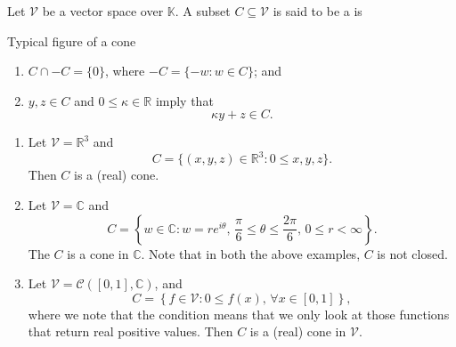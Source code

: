 \documentclass[notoc,notitlepage]{tufte-book}
\begin{document}
\begin{defn}\label{defn:real_cone}
  Let $\mathcal{V}$ be a vector space over $\mathbb{K}$. A subset $C \subseteq
  \mathcal{V}$ is said to be a  is
  \begin{marginfigure}
    \centering
    \caption{Typical figure of a cone}\label{fig:typical_figure_of_a_cone}
  \end{marginfigure}
  \begin{enumerate}
    \item $C \cap -C = \{ 0 \}$, where $-C = \{ - w : w \in C \}$; and
    \item $y, z \in C$ and $0 \leq \kappa \in \mathbb{R}$ imply that
      \begin{equation*}
        \kappa y + z \in C.
      \end{equation*}
  \end{enumerate}
\end{defn}

\begin{eg}
  \begin{enumerate}
    \item Let $\mathcal{V} = \mathbb{R}^3$ and
      \begin{equation*}
        C = \{ (x, y, z) \in \mathbb{R}^3 : 0 \leq x, y, z \}.
      \end{equation*}
      Then $C$ is a (real) cone.
    \item Let $\mathcal{V} = \mathbb{C}$ and 
      \begin{equation*}
        C = \left\{ w \in \mathbb{C} : w = re^{i\theta},\, \frac{\pi}{6} \leq
        \theta \leq \frac{2\pi}{6},\, 0 \leq r < \infty \right\}.
      \end{equation*}
      The $C$ is a cone in $\mathbb{C}$. Note that in both the above examples,
      $C$ is not closed.
    \item Let $\mathcal{V} = \mathcal{C}([0, 1], \mathbb{C})$, and
      \begin{equation*}
        C = \left\{ f \in \mathcal{V} : 0 \leq f(x),\, \forall x \in [0, 1]
        \right\},
      \end{equation*}
      where we note that the condition means that we only look at those
      functions that return real positive values. Then $C$ is a (real) cone in
      $\mathcal{V}$.
  \end{enumerate}
\end{eg}
\end{document}
